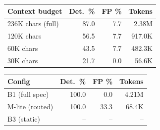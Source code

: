 \begin{tabular}{lrrr}
\toprule
Context budget & Det.\ \% & FP \% & Tokens \\
\midrule
236K chars (full) & 87.0 & 7.7 & 2.38M \\
120K chars & 56.5 & 7.7 & 917.0K \\
60K chars & 43.5 & 7.7 & 482.3K \\
30K chars & 21.7 & 0.0 & 56.6K \\
\bottomrule
\end{tabular}

\begin{tabular}{lrrr}
\toprule
Config & Det.\ \% & FP \% & Tokens \\
\midrule
B1 (full spec) & 100.0 & 0.0 & 4.21M \\
M-lite (routed) & 100.0 & 33.3 & 68.4K \\
B3 (static) & -- & -- & -- \\
\bottomrule
\end{tabular}

